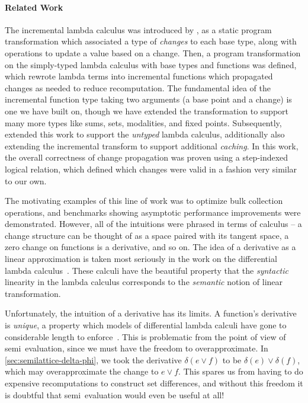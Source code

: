 \paragraph{Related Work}
The incremental lambda calculus was introduced by \citet{incremental},
as a static program transformation which associated a type of
\emph{changes} to each base type, along with operations to update a
value based on a change.  Then, a program transformation on the
simply-typed lambda calculus with base types and functions was
defined, which rewrote lambda terms into incremental functions which
propagated changes as needed to reduce recomputation. The fundamental
idea of the incremental function type taking two arguments (a base
point and a change) is one we have built on, though we have extended
the transformation to support many more types like sums, sets,
modalities, and fixed points.
%
Subsequently, \citet{DBLP:conf/esop/GiarrussoRS19} extended this work
to support the \emph{untyped} lambda calculus, additionally also
extending the incremental transform to support additional
\emph{caching}. In this work, the overall correctness of change
propagation was proven using a step-indexed logical relation, which
defined which changes were valid in a fashion very similar to our own.

The motivating examples of this line of work was to optimize bulk
collection operations, and benchmarks showing asymptotic performance
improvements were demonstrated. However, all of the intuitions were
phrased in terms of calculus -- a change structure can be thought of
as a space paired with its tangent space, a zero change on functions
is a derivative, and so on. The idea of a derivative as a linear
approximation is taken most seriously in the work on
the differential lambda calculus~\cite{dlc}. These calculi have the
beautiful property that the \emph{syntactic} linearity in
the lambda calculus corresponds to the \emph{semantic} notion of
linear transformation. 

Unfortunately, the intuition of a derivative has its limits. A
function's derivative is \emph{unique}, a property which models of
differential lambda calculi have gone to considerable length to
enforce~\cite{differential-categories}. This is problematic from the
point of view of semi\naive\ evaluation, since we must have the
freedom to overapproximate. In
\cref{sec:semilattice-delta-phi}, we took the derivative
$\delta(e \vee f)$ to be $\delta(e) \vee \delta(f)$, which may
overapproximate the change to $e \vee f$. This spares us from having
to do expensive recomputations to construct set differences, and
without this freedom it is doubtful that semi\naive\ evaluation would
even be useful at all!

